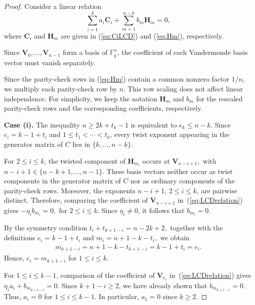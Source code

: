 \documentclass[12pt,draftcls,journal,onecolumn]{IEEEtran}
\newcommand{\F}{{\mathbb{F}}}
\begin{document}
\begin{proof}
Consider a linear relation
\begin{equation}\label{eq:LCDrelation}
\sum_{i=1}^{k} a_i \mathbf{C}_i
+
\sum_{m=1}^{n-k} b_m \mathbf{H}_m
=0,
\end{equation}
where \(\mathbf{C}_i\) and \(\mathbf{H}_m\) are given in
(\ref{eq:CiLCD}) and (\ref{eq:Hm}), respectively.

Since \(\mathbf{V}_0,\ldots,\mathbf{V}_{n-1}\) form a basis of
\(\F_q^n\), the coefficient of each Vandermonde basis vector must
vanish separately.

Since the parity-check rows in (\ref{eq:Hm}) contain a common
nonzero factor \(1/n\), we multiply each parity-check row by \(n\).
This row scaling does not affect linear independence. For simplicity,
we keep the notation \(\mathbf{H}_m\) and \(b_m\) for the rescaled
parity-check rows and the corresponding coefficients, respectively.

\medskip
\noindent\textbf{Case (i).}
The inequality \(n\ge 2k+t_k-1\) is equivalent to
\(e_k\le n-k\). Since
\(
e_i=k-1+t_i
\)
and \(1\le t_1<\cdots<t_k\), every twist exponent appearing in the
generator matrix of \(C\) lies in
\(
\{k,\ldots,n-k\}.
\)

For \(2\le i\le k\), the twisted component of
\(\mathbf{H}_{m_i}\) occurs at
\(
\mathbf{V}_{n-i+1},
\)
with \(n-i+1\in\{n-k+1,\ldots,n-1\}\).
These basis vectors neither occur as twist components in the generator
matrix of \(C\) nor as ordinary components of the parity-check rows.
Moreover, the exponents \(n-i+1\), \(2\le i\le k\), are pairwise
distinct. Therefore, comparing the coefficient of
\(\mathbf{V}_{n-i+1}\) in~(\ref{eq:LCDrelation}) gives
\(
-\eta_i b_{m_i}=0,
\)
for \(2\le i\le k\).
Since \(\eta_i\ne0\), it follows that
\(
b_{m_i}=0.
\)

By the symmetry condition
\(
t_i+t_{k+1-i}=n-2k+2,
\)
together with the definitions
\(
e_i=k-1+t_i\text{ and }
m_i=n+1-k-t_i,
\)
we obtain
\[
\begin{aligned}
m_{k+1-i}=n+1-k-t_{k+1-i}=k-1+t_i=e_i.
\end{aligned}
\]
Hence,
$
e_i=m_{k+1-i}
$
for \(1\le i\le k\).

For \(1\le i\le k-1\), comparison of the coefficient of
\(\mathbf{V}_{e_i}\) in~(\ref{eq:LCDrelation}) gives
\(
\eta_i a_i+b_{m_{k+1-i}}=0.
\)
Since \(k+1-i\ge2\), we have already shown that
\(
b_{m_{k+1-i}}=0.
\)
Thus,
\(a_i=0\) for \(1\le i\le k-1\).
In particular, \(a_1=0\) since \(k\ge2\).


\end{proof}
\end{document}
